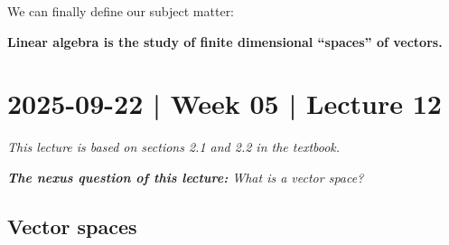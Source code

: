 \documentclass[10pt]{article}
\theoremstyle{definition}
\begin{document}
We can finally define our subject matter:

\begin{center}
  \textbf{Linear algebra is the study of finite dimensional ``spaces'' of
    vectors.}
\end{center}

\newpage
\section{2025-09-22 | Week 05 | Lecture 12}


\textit{This lecture is based on sections 2.1 and 2.2 in the textbook.}
\begin{center}
  \begin{tcolorbox}[width=0.9\textwidth, colback=white, colframe=black]
    \textit{\textbf{The nexus question of this lecture:} What is a vector
      space?}
  \end{tcolorbox}
\end{center}
\subsection{Vector spaces}
\end{document}
